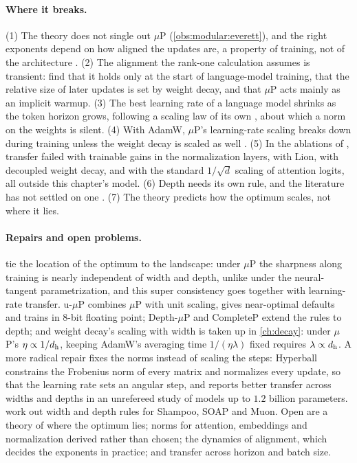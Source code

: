 \begin{refsection}
\paragraph{Where it breaks.} (1) The theory does not single out $\mu$P (\cref{obs:modular:everett}), and the right exponents depend on how aligned the updates are, a property of training, not of the architecture \parencite{EverettEtAl2024}. (2) The alignment the rank-one calculation assumes is transient: \textcite{KossonEtAl2026} find that it holds only at the start of language-model training, that the relative size of later updates is set by weight decay, and that $\mu$P acts mainly as an implicit warmup. (3) The best learning rate of a language model shrinks as the token horizon grows, following a scaling law of its own \parencite{BjorckEtAl2025}, about which a norm on the weights is silent. (4) With AdamW, $\mu$P's learning-rate scaling breaks down during training unless the weight decay is scaled as well \parencite{WangAitchison2025}. (5) In the ablations of \textcite{Lingle2024}, transfer failed with trainable gains in the normalization layers, with Lion, with decoupled weight decay, and with the standard $1/\sqrt{d}$ scaling of attention logits, all outside this chapter's model. (6) Depth needs its own rule, and the literature has not settled on one \parencite{YangEtAl2024,BordelonEtAl2024,DeyEtAl2025}. (7) The theory predicts how the optimum scales, not where it lies.

\paragraph{Repairs and open problems.} \Textcite{NociEtAl2024} tie the location of the optimum to the landscape: under $\mu$P the sharpness along training is nearly independent of width and depth, unlike under the neural-tangent parametrization, and this super consistency goes together with learning-rate transfer. u-$\mu$P \parencite{BlakeEtAl2025} combines $\mu$P with unit scaling, gives near-optimal defaults and trains in 8-bit floating point; Depth-$\mu$P and CompleteP extend the rules to depth; and weight decay's scaling with width is taken up in \cref{ch:decay}: under $\mu$P's $\eta\propto1/d_{\mathrm h}$, keeping AdamW's averaging time $1/(\eta\lambda)$ fixed requires $\lambda\propto d_{\mathrm h}$. A more radical repair fixes the norms instead of scaling the steps: Hyperball \parencite{WenEtAl2026Hyperball} constrains the Frobenius norm of every matrix and normalizes every update, so that the learning rate sets an angular step, and reports better transfer across widths and depths in an unrefereed study of models up to $1.2$ billion parameters. \Textcite{QiuEtAl2025} work out width and depth rules for Shampoo, SOAP and Muon. Open are a theory of where the optimum lies; norms for attention, embeddings and normalization derived rather than chosen; the dynamics of alignment, which decides the exponents in practice; and transfer across horizon and batch size.


\end{refsection}
